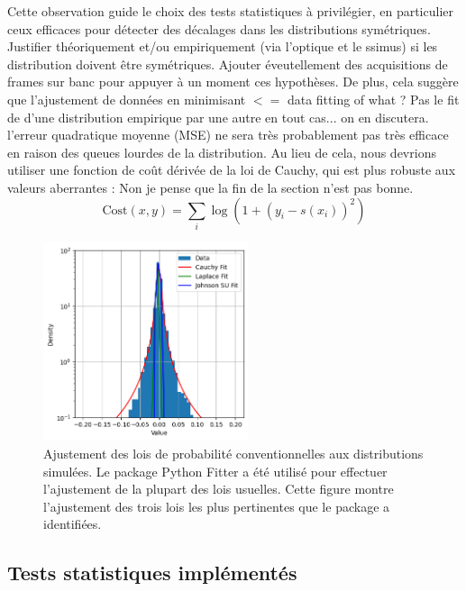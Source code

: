 \documentclass{article}
\newcommand{\dm}[1]{{\color{mulberry} #1}}
\begin{document}
Cette observation guide le choix des tests statistiques à privilégier, en particulier ceux efficaces pour détecter des décalages dans les distributions symétriques.\dm{Justifier théoriquement et/ou empiriquement (via l'optique et le ssimus) si les distribution doivent être symétriques. Ajouter éveutellement des acquisitions de frames sur banc pour appuyer à un moment ces hypothèses. } De plus, cela suggère que l'ajustement de données en minimisant \dm{$<=$ data fitting of what ? Pas le fit de d'une distribution empirique par une autre en tout cas... on en discutera. } l'erreur quadratique moyenne (MSE) ne sera très probablement pas très efficace en raison des queues lourdes de la distribution. Au lieu de cela, nous devrions utiliser une fonction de coût dérivée de la loi de Cauchy, qui est plus robuste aux valeurs aberrantes :\dm{Non je pense que la fin de la section n'est pas bonne.}
\begin{equation}
    \text{Cost}(x, y) = \sum_i \log \left( 1 + \left( y_i - s(x_i )\right)^2 \right)
\end{equation}

\begin{figure}[H]
\centering
\includegraphics[width=6cm]{img/fits.png}
\caption{Ajustement des lois de probabilité conventionnelles aux distributions simulées. Le package Python Fitter a été utilisé pour effectuer l'ajustement de la plupart des lois usuelles. Cette figure montre l'ajustement des trois lois les plus pertinentes que le package a identifiées.}
\label{fig:fits}
\end{figure}

\subsection{Tests statistiques implémentés}
\end{document}

